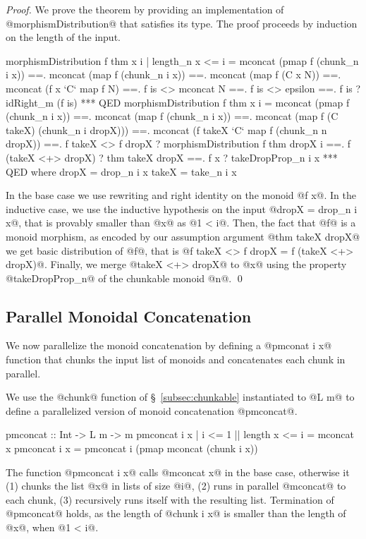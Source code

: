 \begin{proof}
We prove the theorem by providing an implementation of
@morphismDistribution@ that satisfies its type.
%
The proof proceeds by induction on the length of the input.
%
\begin{code}
morphismDistribution f thm x i
  | length_n x <= i
  =   mconcat (pmap f (chunk_n i x))
  ==. mconcat (map f (chunk_n i x))
  ==. mconcat (map f (C x N))
  ==. mconcat (f x `C` map f N)
  ==. f is <> mconcat N
  ==. f is <> epsilon
  ==. f is ? idRight_m (f is)
  *** QED
morphismDistribution f thm x i
  =   mconcat (pmap f (chunk_n i x))
  ==. mconcat (map f (chunk_n i x))
  ==. mconcat (map f (C takeX) (chunk_n i dropX)))
  ==. mconcat (f takeX `C` map f (chunk_n n dropX))
  ==. f takeX <> f dropX
      ? morphismDistribution f thm dropX i
  ==. f (takeX <+> dropX)
      ? thm takeX dropX
  ==. f x
      ? takeDropProp_n i x
  *** QED
  where
    dropX = drop_n i x
    takeX = take_n i x
\end{code}
%
In the base case we use rewriting and right identity on the monoid @f x@.
%
In the inductive case,
we use the inductive hypothesis on the input @dropX = drop_n i x@,
that is provably smaller than @x@ as @1 < i@.
%
Then, the fact that @f@ is a monoid morphism,
as encoded by our assumption argument @thm takeX dropX@
we get basic distribution of @f@, that is
@f takeX <> f dropX = f (takeX <+> dropX)@.
%
Finally, we merge @takeX <+> dropX@ to @x@
using the property @takeDropProp_n@ of the chunkable monoid @n@.
\qed\end{proof}


\subsection{Parallel Monoidal Concatenation}\label{subsec:pmconcat}
%
We now parallelize the monoid concatenation by defining a
@pmconat i x@ function that chunks the input list of monoids and concatenates each
chunk in parallel.

We use the @chunk@ function of \S~\ref{subsec:chunkable} instantiated to @L m@ to define a parallelized version of
monoid concatenation @pmconcat@.
\begin{code}
pmconcat :: Int -> L m -> m
pmconcat i x | i <= 1 || length x <= i
  = mconcat x
pmconcat i x
  = pmconcat i (pmap mconcat (chunk i x))
\end{code}
The function @pmconcat i x@ calls @mconcat x@ in the base case,
otherwise it
(1) chunks the list @x@ in lists of size @i@,
(2) runs in parallel @mconcat@ to each chunk,
(3) recursively runs itself with the resulting list.
%
Termination of @pmconcat@ holds, as the length of @chunk i x@
is smaller than the length of @x@, when @1 < i@.

